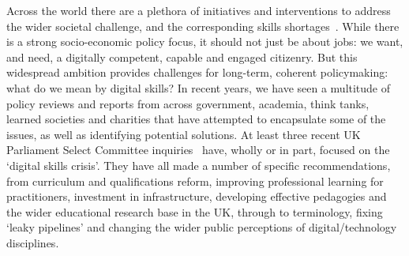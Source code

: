 \documentclass[conference]{IEEEtran}
\begin{document}



Across the world there are a plethora of initiatives and interventions
to address the wider societal challenge, and the corresponding skills
shortages~\cite{cece:2017}. While there is a strong socio-economic
policy focus, it should not just be about jobs: we want, and need, a
digitally competent, capable and engaged citizenry. But this
widespread ambition provides challenges for long-term, coherent
policymaking: what do we mean by digital skills? In recent years, we
have seen a multitude of policy reviews and reports from across
government, academia, think tanks, learned societies and charities
that have attempted to encapsulate some of the issues, as well as
identifying potential solutions. At least three recent UK Parliament
Select Committee
inquiries~\cite{ukholds:2015,ukhocst:2016,ukholc:2017} have, wholly or
in part, focused on the `digital skills crisis'. They have all made a
number of specific recommendations, from curriculum and qualifications
reform, improving professional learning for practitioners, investment
in infrastructure, developing effective pedagogies and the wider
educational research base in the UK, through to terminology, fixing
`leaky pipelines' and changing the wider public perceptions of
digital/technology disciplines.
\end{document}
